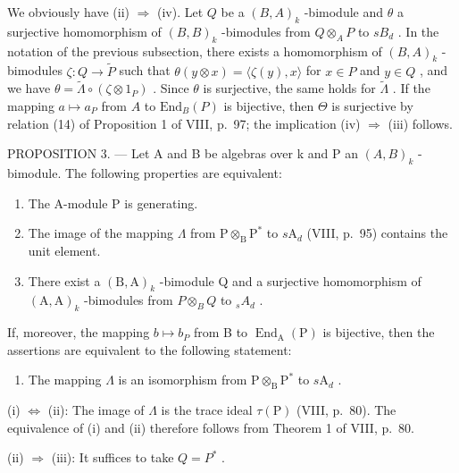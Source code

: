 We obviously have (ii) \(\Rightarrow\) (iv). Let \(Q\) be a \((B,A)_k\) -bimodule and \(\theta\) a surjective homomorphism of \((B,B)_k\) -bimodules from \(Q \otimes_A P\) to \(s B_d\) . In the notation of the previous subsection, there exists a homomorphism of \((B,A)_k\) -bimodules \(\zeta: Q \to \widetilde{P}\) such that \(\theta(y \otimes x) = \langle \zeta(y), x \rangle\) for \(x \in P\) and \(y \in Q\) , and we have \(\theta = \widetilde{\Lambda} \circ (\zeta \otimes 1_P)\) . Since \(\theta\) is surjective, the same holds for \(\widetilde{\Lambda}\) . If the mapping \(a \mapsto a_P\) from \(A\) to \(\mathrm{End}_B(P)\) is bijective, then \(\Theta\) is surjective by relation (14) of Proposition 1 of VIII, p.~97; the implication (iv) \(\Rightarrow\) (iii) follows.

PROPOSITION 3. --- Let A and B be algebras over k and P an \((A,B)_{k}\) -bimodule. The following properties are equivalent:

\begin{enumerate}
\def\labelenumi{(\roman{enumi})}
\item
  The A-module P is generating.
\item
  The image of the mapping \(\Lambda\) from \(\mathrm{P} \otimes_{\mathrm{B}} \mathrm{P}^{*}\) to \(s\mathrm{A}_{d}\) (VIII, p.~95) contains the unit element.
\item
  There exist a \((\mathrm{B},\mathrm{A})_{k}\) -bimodule Q and a surjective homomorphism of \((\mathrm{A},\mathrm{A})_{k}\) -bimodules from \(P\otimes_{B}Q\) to \(_{s}A_{d}\) .
\end{enumerate}

If, moreover, the mapping \(b \mapsto b_{P}\) from B to \(\operatorname{End}_{\mathrm{A}}(\mathrm{P})\) is bijective, then the assertions are equivalent to the following statement:

\begin{enumerate}
\def\labelenumi{(\roman{enumi})}
\setcounter{enumi}{3}
\tightlist
\item
  The mapping \(\Lambda\) is an isomorphism from \(\mathrm{P} \otimes_{\mathrm{B}} \mathrm{P}^{*}\) to \(s\mathrm{A}_d\) .
\end{enumerate}

(i) \(\Leftrightarrow\) (ii): The image of \(\Lambda\) is the trace ideal \(\tau(\mathrm{P})\) (VIII, p.~80). The equivalence of (i) and (ii) therefore follows from Theorem 1 of VIII, p.~80.

(ii) \(\Rightarrow\) (iii): It suffices to take \(Q = P^{*}\) .

